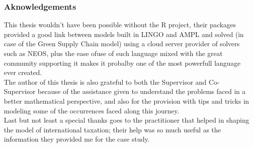 \begin{doublespace}
\subsubsection{Aknowledgements}
This thesis wouldn't have been possible without the R project, their packages provided a good link between models built in LINGO and AMPL\cite{Fourer1997} and solved (in case of the Green Supply Chain model) using a cloud server provider of solvers such as NEOS, plus the ease ofuse of such language mixed with the great community supporting it makes it probalby one of the most powerfull language ever created. 
\\
The author of this thesis is also grateful to both the Supervisor and Co-Supervisor because of the assistance given to understand the problems faced in a better mathematical perspective, and also for the provision with tips and tricks in modeling some of the occurrences faced along this journey.
\\
Last but not least a special thanks goes to the practitioner that helped in shaping the model of international taxation; their help was so much useful as the information they provided me for the case study.    
\end{doublespace}

\clearpage{\pagestyle{empty}\cleardoublepage}
